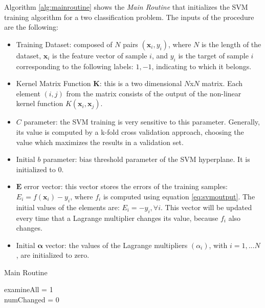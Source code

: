 \documentclass{ipol}
\def\x{{\mathbf x}}
\def\E{{\mathbf E}}
\begin{document}
Algorithm \ref{alg:mainroutine} shows the \textit{Main Routine} that initializes the SVM training algorithm for a two classification problem.
The inputs of the procedure are the following:
\begin{itemize}
\item Training Dataset: composed of $N$ pairs $(\x_i,y_i)$, where $N$ is the length of the dataset, $\x_i$ is the feature vector of sample $i$, and $y_i$ is the target of sample $i$ corresponding to the following labels: ${1,-1}$, indicating to which it belongs.
\item Kernel Matrix Function $\mathbf{K}$: this is a two dimensional $N$x$N$ matrix. 
Each element $(i,j)$ from the matrix consists of the output of the non-linear kernel function $K(\x_i,\x_j)$.
\item $C$ parameter: the SVM training is very sensitive to this parameter.
Generally, its value is computed by a k-fold cross validation approach, choosing the value which maximizes the results in a validation set.
\item Initial $b$ parameter: bias threshold parameter of the SVM hyperplane. It is initialized to 0.
\item $\E$ error vector: this vector stores the errors of the training samples: $E_i = f(\x_i) - y_i$, where $f_i$ is computed using equation \ref{eq:svmoutput}.
The initial values of the elements are: $E_i = - y_i, \forall i$.
This vector will be updated every time that a Lagrange multiplier changes its value, because $f_i$ also changes.
\item Initial $\mathbf{\alpha}$ vector: the values of the Lagrange multipliers $(\alpha_i)$, with $i=1,...N$, are initialized to zero. 
\end{itemize}

\begin{algorithm}[!htbp]
\small
\caption{Main Routine}
\DontPrintSemicolon
examineAll = 1\\
numChanged = 0\\
\label{alg:mainroutine}
\end{algorithm}
\end{document}
